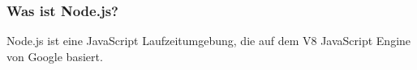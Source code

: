 \subsubsection{Was ist Node.js?}
Node.js ist eine JavaScript Laufzeitumgebung, die auf dem V8 JavaScript Engine von Google basiert.
